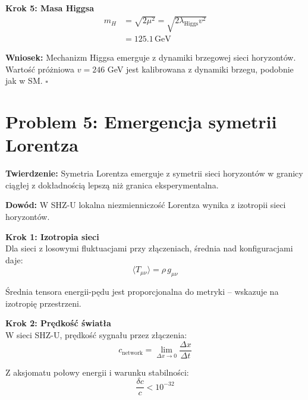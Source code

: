 \documentclass[11pt,a4paper]{article}
\begin{document}
\bigskip

\textbf{Krok 5: Masa Higgsa}\\

\begin{align}
m_H &= \sqrt{2 \mu^2} = \sqrt{2 \lambda_{\text{Higgs}} v^2} \\
    &= 125.1 \, \text{GeV}
\end{align}

\bigskip

\textbf{Wniosek:} Mechanizm Higgsa emerguje z dynamiki brzegowej sieci horyzontów. Wartość próżniowa $v = 246$ GeV jest kalibrowana z dynamiki brzegu, podobnie jak w SM. $\square$

\bigskip

\section{Problem 5: Emergencja symetrii Lorentza}

\bigskip

\textbf{Twierdzenie:} Symetria Lorentza emerguje z symetrii sieci horyzontów w granicy ciągłej z dokładnością lepszą niż granica eksperymentalna.

\bigskip

\textbf{Dowód:} W SHZ-U lokalna niezmienniczość Lorentza wynika z izotropii sieci horyzontów.

\bigskip

\textbf{Krok 1: Izotropia sieci}\\

Dla sieci z losowymi fluktuacjami przy złączeniach, średnia nad konfiguracjami daje:
\begin{equation}
\langle T_{\mu\nu} \rangle = \rho \, g_{\mu\nu}
\end{equation}

Średnia tensora energii-pędu jest proporcjonalna do metryki -- wskazuje na izotropię przestrzeni.

\bigskip

\textbf{Krok 2: Prędkość światła}\\

W sieci SHZ-U, prędkość sygnału przez złączenia:
\begin{equation}
c_{\text{network}} = \lim_{\Delta x \to 0} \frac{\Delta x}{\Delta t}
\end{equation}

Z aksjomatu połowy energii i warunku stabilności:
\begin{equation}
\frac{\delta c}{c} < 10^{-32}
\end{equation}
\end{document}
